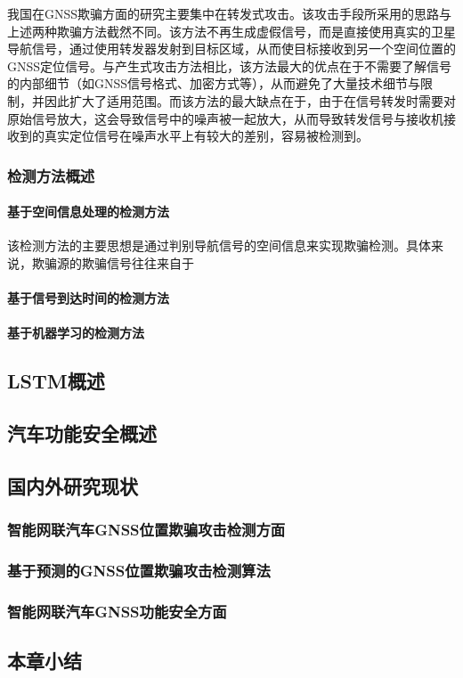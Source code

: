 我国在GNSS欺骗方面的研究主要集中在转发式攻击。该攻击手段所采用的思路与上述两种欺骗方法截然不同。该方法不再生成虚假信号，而是直接使用真实的卫星导航信号，通过使用转发器发射到目标区域，从而使目标接收到另一个空间位置的GNSS定位信号。与产生式攻击方法相比，该方法最大的优点在于不需要了解信号的内部细节（如GNSS信号格式、加密方式等），从而避免了大量技术细节与限制，并因此扩大了适用范围。而该方法的最大缺点在于，由于在信号转发时需要对原始信号放大，这会导致信号中的噪声被一起放大，从而导致转发信号与接收机接收到的真实定位信号在噪声水平上有较大的差别，容易被检测到。
\subsubsection{检测方法概述}
\paragraph{基于空间信息处理的检测方法}

该检测方法的主要思想是通过判别导航信号的空间信息来实现欺骗检测。具体来说，欺骗源的欺骗信号往往来自于
\paragraph{基于信号到达时间的检测方法}
\paragraph{基于机器学习的检测方法}


\subsection{LSTM概述}
\subsection{汽车功能安全概述}
\subsection{国内外研究现状}
\subsubsection{智能网联汽车GNSS位置欺骗攻击检测方面}
\subsubsection{基于预测的GNSS位置欺骗攻击检测算法}
\subsubsection{智能网联汽车GNSS功能安全方面}
\subsection{本章小结}
